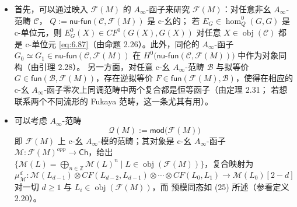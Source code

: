 \begin{itemize}
  \item 首先，可以通过映入 $\mathcal F(M)$ 的 $A_\infty$-函子来研究
  $\mathcal F(M)$：对任意非幺 $A_\infty$-范畴 $\mathcal C$，
  $Q:=\mathsf{nu}\text{-}\mathsf{fun}(\mathcal C,\mathcal F(M))$ 是 c-幺的；
  若 $E_G\in\hom^0_Q(G,G)$ 是 c-单位元，则
  $E^0_G(X)\in CF^0(G(X),G(X))$ 对任意 $X\in\operatorname{obj}(\mathcal C)$
  都是 c-单位元 \eqref{eq:6.87}（由命题 2.26）。此外，同伦的
  $A_\infty$-函子 $G_0\simeq G_1\in
  \mathsf{nu}\text{-}\mathsf{fun}(\mathcal C,\mathcal F(M))$ 在
  $H^0\bigl(\mathsf{nu}\text{-}\mathsf{fun}(\mathcal C,\mathcal F(M))\bigr)$
  中作为对象同构（由引理 2.28）。
  另一方面，对任意 c-幺 $A_\infty$-范畴 $\mathcal B$ 与拟等价
  $G\in\mathsf{fun}(\mathcal B,\mathcal F(M))$，存在逆拟等价
  $F\in\mathsf{fun}(\mathcal F(M),\mathcal B)$，使得在相应的 c-幺
  $A_\infty$-函子零次上同调范畴中两个复合都是恒等函子（由定理 2.31；
  若想联系两个不同流形的 Fukaya 范畴，这一条尤其有用）。
  \item 可以考虑 $A_\infty$-范畴
  \[
  \mathcal Q(M):=\mathsf{mod}\bigl(\mathcal F(M)\bigr)
  \]
  即 $\mathcal F(M)$ 上 c-幺 $A_\infty$-模的范畴；其对象是 c-幺
  $A_\infty$-函子 $\mathcal M:\mathcal F(M)^{opp}\to\mathsf{Ch}$，给出
  $\{\mathcal M(L)=\bigoplus_{n\in\mathbb Z}\mathcal M(L)^n\mid
  L\in\operatorname{obj}(\mathcal F(M))\}$，复合映射为
  \[
  \mu^d_{\mathcal M}:\mathcal M(L_{d-1})\otimes CF(L_{d-2},L_{d-1})
  \otimes\cdots\otimes CF(L_0,L_1)\to\mathcal M(L_0)[2-d]
  \]
  对一切 $d\ge 1$ 与 $L_i\in\operatorname{obj}(\mathcal F(M))$，而
  预模同态如 (25) 所述（参看定义 2.20）。


\end{itemize}
